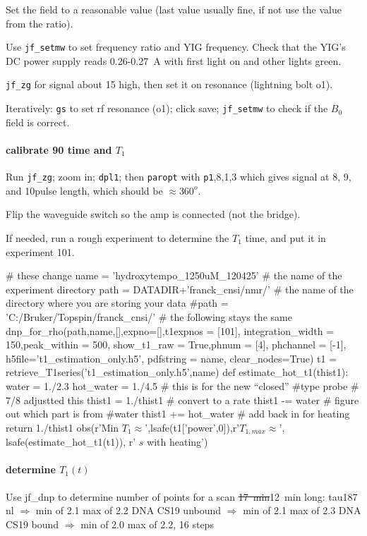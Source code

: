 Set the field to a reasonable value (last value usually fine, if not use the value from the ratio).

Use \texttt{jf\_setmw} to set frequency ratio and YIG frequency.
Check that the YIG's DC power supply reads 0.26-0.27~A with first light on and other lights green.

\texttt{jf\_zg} for signal about 15 high, then set it on resonance (lightning bolt o1).

Iteratively: \texttt{gs} to set rf resonance (o1); click save; \texttt{jf\_setmw} to check if the $B_0$ field is correct.

\paragraph{calibrate 90 time and $T_1$}

Run \texttt{jf_zg}; zoom in; \texttt{dpl1}; then \texttt{paropt} with \texttt{p1},8,1,3 which gives signal at 8\us, 9\us, and 10\us pulse length, which should be $\approx 360^o$.

Flip the waveguide switch so the amp is connected (not the bridge).

If needed, run a rough experiment to determine the $T_1$ time, and put it in experiment 101.

\begin{scriptsize}
\begin{python}[on]
# these change
name = 'hydroxytempo_1250uM_120425' # the name of the experiment directory
path = DATADIR+'franck_cnsi/nmr/' # the name of the directory where you are storing your data
#path = 'C:/Bruker/Topspin/franck_cnsi/'
# the following stays the same
dnp_for_rho(path,name,[],expno=[],t1expnos = [101],
        integration_width = 150,peak_within = 500,
        show_t1_raw = True,phnum = [4],
        phchannel = [-1],
        h5file='t1_estimation_only.h5',
        pdfstring = name,
        clear_nodes=True)
t1 = retrieve_T1series('t1_estimation_only.h5',name)
def estimate_hot_t1(thist1):
    water = 1./2.3
    hot_water = 1./4.5 # this is for the new ``closed''
    #type probe # 7/8 adjustted this
    thist1 = 1./thist1 # convert to a rate
    thist1 -= water # figure out which part is from
    #water
    thist1 += hot_water # add back in for heating
    return 1./thist1
obs(r'Min $T_1\approx$',lsafe(t1['power',0]),r'\quad $T_{1,max}\approx$',
        lsafe(estimate_hot_t1(t1)),
        r' $s$ with heating')
\end{python}
\end{scriptsize}
\paragraph{determine $T_1(t)$}
Use jf\_dnp to determine number of points for a scan \sout{17~min}12~min long:
tau187 nl $\Rightarrow$ min of 2.1 max of 2.2
DNA CS19 unbound $\Rightarrow$ min of 2.1 max of 2.3
DNA CS19 bound $\Rightarrow$ min of 2.0 max of 2.2, 16 steps

